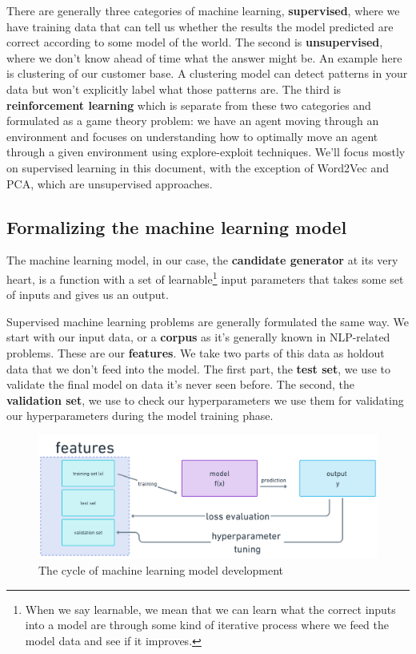 \documentclass[11pt]{diazessay} %
\begin{document}
There are generally three categories of machine learning, \textbf{supervised}, where we have training data that can tell us whether the results the model predicted are correct according to some model of the world. The second is \textbf{unsupervised}, where we don't know ahead of time what the answer might be. An example here is clustering of our customer base. A clustering model can detect patterns in your data but won't explicitly label what those patterns are. The third is \textbf{reinforcement learning}  which is separate from these two categories and formulated as a game theory problem: we have an agent moving through an environment and focuses on understanding how to optimally move an agent through a given environment using explore-exploit techniques. We'll focus mostly on supervised learning in this document, with the exception of Word2Vec and PCA, which are unsupervised approaches. 

\subsection{Formalizing the machine learning model}

The machine learning model, in our case, the \textbf{candidate generator} at its very heart, is a function with a set of learnable\footnote{When we say learnable, we mean that we can learn what the correct inputs into a model are through some kind of iterative process where we feed the model data and see if it improves.} input parameters that takes some set of inputs and gives us an output. 

Supervised machine learning problems are generally formulated the same way. We start with our input data, or a \textbf{corpus} as it's generally known in NLP-related problems. These are our \textbf{features}.  We take two parts of this data as holdout data that we don't feed into the model. The first part, the \textbf{test set}, we use to validate the final model on data it's never seen before. The second, the \textbf{validation set}, we use to check our hyperparameters we use them for validating our hyperparameters during the model training phase. 

\begin{figure}[!ht]
  \includegraphics[width=\linewidth]{figures/model_cycle.png}
  \caption{The cycle of machine learning model development}
\end{figure}
\end{document}
